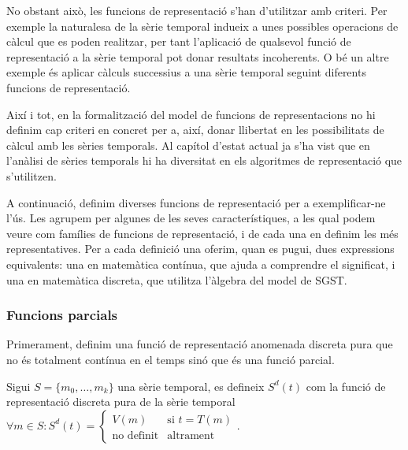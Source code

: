 No obstant això, les funcions de representació s'han d'utilitzar amb
criteri. Per exemple la naturalesa de la sèrie temporal indueix a unes
possibles operacions de càlcul que es poden realitzar, per tant
l'aplicació de qualsevol funció de representació a la sèrie temporal
pot donar resultats incoherents. O bé un altre exemple és aplicar
càlculs successius a una sèrie temporal seguint diferents funcions de
representació.  

Així i tot, en la formalització del model de funcions de
representacions no hi definim cap criteri en concret per a, així,
donar llibertat en les possibilitats de càlcul amb les sèries
temporals. Al capítol  d'estat actual ja s'ha vist que en
l'anàlisi de sèries temporals hi ha diversitat en els algoritmes de
representació que s'utilitzen.


A continuació, definim diverses funcions de representació per a
exemplificar-ne l'ús. Les agrupem per algunes de les seves
característiques, a les qual podem veure com famílies de funcions de
representació, i de cada una en definim les més representatives. Per a
cada definició una oferim, quan es pugui, dues expressions
equivalents: una en matemàtica contínua, que ajuda a comprendre el
significat, i una en matemàtica discreta, que utilitza l'àlgebra del
model de SGST.



\subsubsection{Funcions parcials}


Primerament, definim una funció de representació anomenada discreta
pura que no és totalment contínua en el temps sinó que és una funció
parcial.
\begin{definition}
  Sigui $S=\{m_0,\ldots,m_k\}$ una sèrie temporal, es defineix
  $S^d(t)$ com la funció de representació discreta pura de la sèrie
  temporal $\forall m \in S: S^d(t) =
  \begin{cases}
    V(m) & \text{si }  t=T(m) \\
    \text{no definit} & \text{altrament}
  \end{cases}$.
\end{definition}

